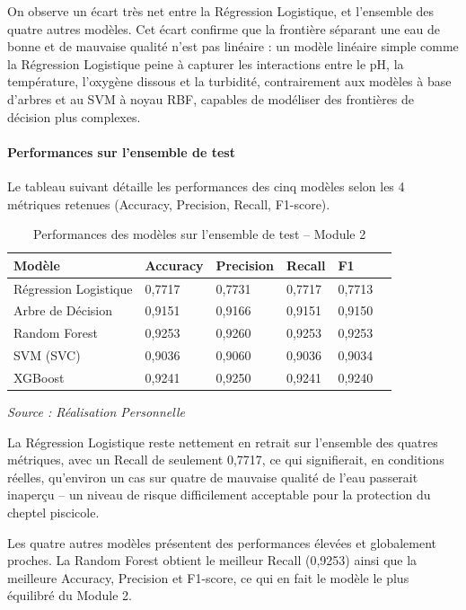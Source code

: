 \documentclass[a4paper,12pt, oneside]{article}
\begin{document}
On observe un écart très net entre la Régression Logistique, et l'ensemble des quatre autres modèles. Cet écart confirme que la frontière séparant une eau de bonne et de mauvaise qualité n'est pas linéaire : un modèle linéaire simple comme la Régression Logistique peine à capturer les interactions entre le pH, la température, l'oxygène dissous et la turbidité, contrairement aux modèles à base d'arbres et au SVM à noyau RBF, capables de modéliser des frontières de décision plus complexes.

\paragraph{Performances sur l'ensemble de test\\}
Le tableau suivant détaille les performances des cinq modèles selon les 4 métriques retenues (Accuracy, Precision, Recall, F1-score).

\begin{table}[H]
\centering
\begin{tabular}{|p{3.5cm}|p{1.9cm}|p{1.9cm}|p{1.9cm}|p{1.5cm}|p{1.9cm}|}
\hline
\textbf{Modèle} & \textbf{Accuracy} & \textbf{Precision} & \textbf{Recall} & \textbf{F1} \\
\hline
Régression Logistique & 0,7717 & 0,7731 & 0,7717 & 0,7713 \\
\hline
Arbre de Décision & 0,9151 & 0,9166 & 0,9151 & 0,9150  \\
\hline
Random Forest & 0,9253 & 0,9260 & 0,9253 & 0,9253  \\
\hline
SVM (SVC) & 0,9036 & 0,9060 & 0,9036 & 0,9034  \\
\hline
XGBoost & 0,9241 & 0,9250 & 0,9241 & 0,9240  \\
\hline
\end{tabular}
\caption{Performances des modèles sur l'ensemble de test -- Module 2}
\textit{Source : Réalisation Personnelle}
\end{table}


La Régression Logistique reste nettement en retrait sur l'ensemble des quatres métriques, avec un Recall de seulement 0,7717, ce qui signifierait, en conditions réelles, qu'environ un cas sur quatre de mauvaise qualité de l'eau passerait inaperçu -- un niveau de risque difficilement acceptable pour la protection du cheptel piscicole.

Les quatre autres modèles présentent des performances élevées et globalement proches. La Random Forest obtient le meilleur Recall (0,9253) ainsi que la meilleure Accuracy, Precision et F1-score, ce qui en fait le modèle le plus équilibré du Module 2. 
\end{document}
